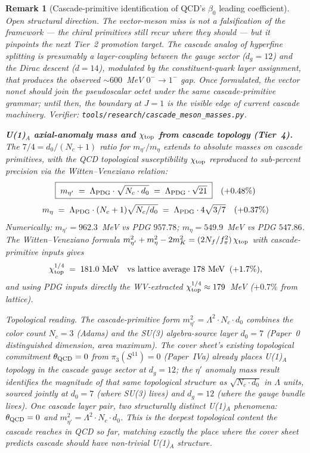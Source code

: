 \documentclass[12pt,a4paper]{article}
\newtheorem*{remark}{Remark}
\begin{document}
\begin{remark}[Cascade-primitive identification of QCD's $\beta_0$ leading coefficient]
\emph{Open structural direction.} The vector-meson miss is not a
falsification of the framework --- the chiral primitives still recur
where they should --- but it pinpoints the next Tier~2 promotion
target. The cascade analog of hyperfine splitting is presumably a
layer-coupling between the gauge sector ($d_g = 12$) and the Dirac
descent ($d=14$), modulated by the constituent-quark layer
assignment, that produces the observed $\sim 600$~MeV $0^-\to1^-$
gap. Once formulated, the vector nonet should join the pseudoscalar
octet under the same cascade-primitive grammar; until then, the
boundary at $J=1$ is the visible edge of current cascade machinery.
Verifier: \texttt{tools/research/cascade\_meson\_masses.py}.

\medskip\noindent\textbf{U(1)$_{\!A}$ axial-anomaly mass and $\chi_{\rm top}$
from cascade topology (Tier~4).} The $7/4 = d_0/(N_c+1)$ ratio for
$m_{\eta'}/m_\eta$ extends to absolute masses on cascade primitives,
with the QCD topological susceptibility $\chi_{\rm top}$ reproduced
to sub-percent precision via the Witten--Veneziano relation:
\[
\boxed{\;m_{\eta'} \;=\; \Lambda_{\rm PDG}\cdot\sqrt{N_c\cdot d_0}
       \;=\; \Lambda_{\rm PDG}\cdot\sqrt{21}\;}\quad(+0.48\%)
\]
\[
m_\eta \;=\; \Lambda_{\rm PDG}\cdot(N_c+1)\sqrt{N_c/d_0}
        \;=\; \Lambda_{\rm PDG}\cdot 4\sqrt{3/7}\quad(+0.37\%)
\]
Numerically: $m_{\eta'} = 962.3$~MeV vs PDG $957.78$; $m_\eta = 549.9$~MeV
vs PDG $547.86$. The Witten--Veneziano formula
$m_{\eta'}^2 + m_\eta^2 - 2 m_K^2 = (2 N_f / f_\pi^2)\,\chi_{\rm top}$
with cascade-primitive inputs gives
\[
\chi_{\rm top}^{1/4} \;=\; 181.0\text{~MeV} \quad
\text{vs lattice average } 178\text{~MeV}\;\;(+1.7\%),
\]
and using PDG inputs directly the WV-extracted $\chi_{\rm top}^{1/4}
\approx 179$~MeV ($+0.7\%$ from lattice).

\emph{Topological reading.} The cascade-primitive form $m_{\eta'}^2 =
\Lambda^2\cdot N_c\cdot d_0$ combines the color count $N_c=3$ (Adams)
and the SU(3) algebra-source layer $d_0=7$ (Paper~0 distinguished
dimension, area maximum). The cover sheet's existing topological
commitment $\theta_{\rm QCD}=0$ from $\pi_3(S^{11})=0$ (Paper~IVa)
already places U(1)$_{\!A}$ topology in the cascade gauge sector at
$d_g=12$; the $\eta'$ anomaly mass result identifies the
\emph{magnitude} of that same topological structure as $\sqrt{N_c\cdot d_0}$
in $\Lambda$ units, sourced jointly at $d_0=7$ (where SU(3) lives)
and $d_g=12$ (where the gauge bundle lives). One cascade layer pair,
two structurally distinct U(1)$_{\!A}$ phenomena: $\theta_{\rm QCD}=0$
\emph{and} $m_{\eta'}^2 = \Lambda^2\cdot N_c\cdot d_0$. This is the
deepest topological content the cascade reaches in QCD so far,
matching exactly the place where the cover sheet predicts cascade
should have non-trivial U(1)$_{\!A}$ structure.


\end{remark}
\end{document}
